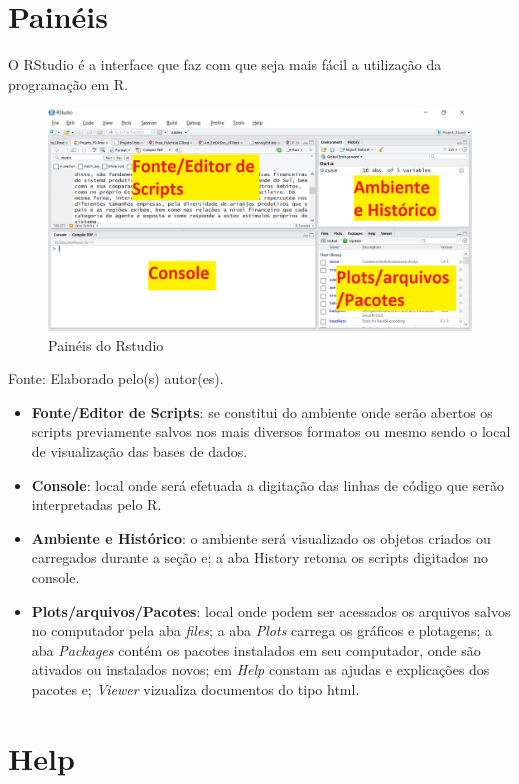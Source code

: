 \documentclass[12pt,brazil,oneside]{book}
\providecommand{\tightlist}{%
  \setlength{\itemsep}{0pt}\setlength{\parskip}{0pt}}
\begin{document}
\hypertarget{paineis}{%
\section{Painéis}\label{paineis}}

O RStudio é a interface que faz com que seja mais fácil a utilização da programação em R.

\begin{figure}[H]

{\centering \includegraphics[width=0.7\linewidth]{paineis} 

}

\caption{Painéis do Rstudio}\label{fig:paineis1}
\end{figure}

Fonte: Elaborado pelo(s) autor(es).

\begin{itemize}
\tightlist
\item
  \textbf{Fonte/Editor de Scripts}: se constitui do ambiente onde serão abertos os scripts previamente salvos nos mais diversos formatos ou mesmo sendo o local de visualização das bases de dados.
\item
  \textbf{Console}: local onde será efetuada a digitação das linhas de código que serão interpretadas pelo R.
\item
  \textbf{Ambiente e Histórico}: o ambiente será visualizado os objetos criados ou carregados durante a seção e; a aba History retoma os scripts digitados no console.
\item
  \textbf{Plots/arquivos/Pacotes}: local onde podem ser acessados os arquivos salvos no computador pela aba \emph{files}; a aba \emph{Plots} carrega os gráficos e plotagens; a aba \emph{Packages} contém os pacotes instalados em seu computador, onde são ativados ou instalados novos; em \emph{Help} constam as ajudas e explicações dos pacotes e; \emph{Viewer} vizualiza documentos do tipo html.
\end{itemize}

\hypertarget{help}{%
\section{Help}\label{help}}
\end{document}
